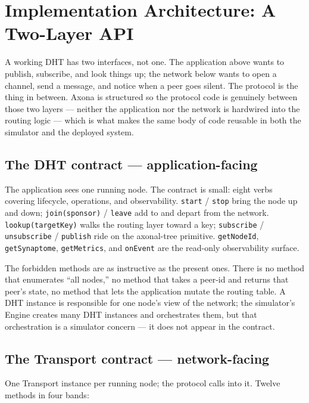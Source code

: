 \documentclass[conference]{IEEEtran}
\newcommand{\axona}{Axona\xspace}
\begin{document}
\section{Implementation Architecture: A Two-Layer API}
\label{sec:architecture}

A working DHT has two interfaces, not one. The application above
wants to publish, subscribe, and look things up; the network below
wants to open a channel, send a message, and notice when a peer
goes silent. The protocol is the thing in between. \axona is
structured so the protocol code is genuinely between those two
layers --- neither the application nor the network is hardwired
into the routing logic --- which is what makes the same body of
code reusable in both the simulator and the deployed system.

\subsection{The DHT contract --- application-facing}

The application sees one running node. The contract is small:
eight verbs covering lifecycle, operations, and observability.
\texttt{start} / \texttt{stop} bring the node up and down;
\texttt{join(sponsor)} / \texttt{leave} add to and depart from the
network. \texttt{lookup(targetKey)} walks the routing layer toward
a key; \texttt{subscribe} / \texttt{unsubscribe} / \texttt{publish}
ride on the axonal-tree primitive. \texttt{getNodeId},
\texttt{getSynaptome}, \texttt{getMetrics}, and \texttt{onEvent}
are the read-only observability surface.

The forbidden methods are as instructive as the present ones.
There is no method that enumerates ``all nodes,'' no method that
takes a peer-id and returns that peer's state, no method that lets
the application mutate the routing table. A DHT instance is
responsible for one node's view of the network; the simulator's
Engine creates many DHT instances and orchestrates them, but that
orchestration is a simulator concern --- it does not appear in the
contract.

\subsection{The Transport contract --- network-facing}

One Transport instance per running node; the protocol calls into
it. Twelve methods in four bands:
\end{document}

